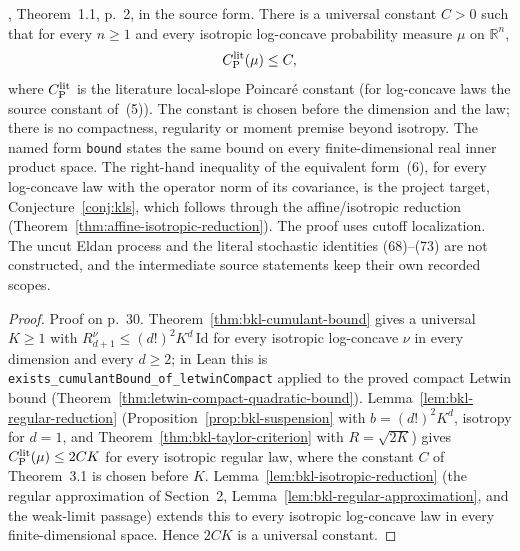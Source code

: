 \begin{theorem}
  \label{thm:bkl-poincare}
  \leanok
  \cite{BizeulKlartagLehec2026}, Theorem~1.1, p.~2, in the source form. There is a universal constant $C>0$ such that
  for every $n\ge1$ and every isotropic log-concave probability measure $\mu$ on $\mathbb R^n$,
  \[
    C_{\mathrm P}^{\mathrm{lit}}(\mu)\le C,
  \]
  where $C_{\mathrm P}^{\mathrm{lit}}$ is the literature local-slope Poincaré constant (for log-concave laws the source constant of~(5)). The
  constant is chosen before the dimension and the law; there is no compactness, regularity or moment premise beyond
  isotropy. The named form \texttt{bound} states the same bound on every finite-dimensional real inner product space.
  The right-hand inequality of the equivalent form~(6), for every log-concave law with the operator norm of its
  covariance, is the project target, Conjecture~\ref{conj:kls}, which follows through the affine/isotropic reduction
  (Theorem~\ref{thm:affine-isotropic-reduction}). The proof uses cutoff localization.
  The uncut Eldan process and the literal stochastic identities (68)--(73) are not constructed, and the
  intermediate source statements keep their own recorded scopes.
\end{theorem}
\begin{proof}
  \leanok
  Proof on p.~30. Theorem~\ref{thm:bkl-cumulant-bound} gives a universal $K\ge1$ with
  $R^\nu_{d+1}\le(d!)^2K^d\,\mathrm{Id}$ for every isotropic log-concave $\nu$ in every dimension and every $d\ge2$; in
  Lean this is \texttt{exists_cumulantBound_of_letwinCompact} applied to the proved compact Letwin bound
  (Theorem~\ref{thm:letwin-compact-quadratic-bound}). Lemma~\ref{lem:bkl-regular-reduction}
  (Proposition~\ref{prop:bkl-suspension} with $b=(d!)^2K^d$, isotropy for $d=1$, and
  Theorem~\ref{thm:bkl-taylor-criterion} with $R=\sqrt{2K}$) gives $C_{\mathrm P}^{\mathrm{lit}}(\mu)\le2CK$ for every isotropic regular law,
  where the constant $C$ of Theorem~3.1 is chosen before $K$. Lemma~\ref{lem:bkl-isotropic-reduction} (the regular
  approximation of Section~2, Lemma~\ref{lem:bkl-regular-approximation}, and the weak-limit passage) extends this to
  every isotropic log-concave law in every finite-dimensional space. Hence $2CK$ is a universal constant.
\end{proof}

